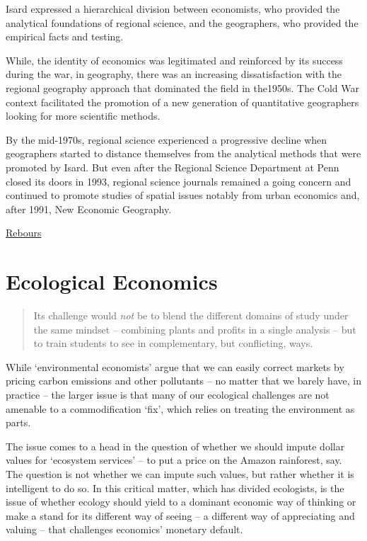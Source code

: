\documentclass[
]{book}
\begin{document}
Isard expressed a hierarchical division between economists, who provided
the analytical foundations of regional science,
and the geographers, who provided the empirical facts and testing.

While, the identity of economics was legitimated and reinforced by its success during the war, in geography, there was an increasing dissatisfaction with the regional geography approach that dominated the field in the1950s. The Cold War context facilitated the promotion of a new generation of quantitative geographers looking for more scientific methods.

By the mid-1970s, regional science experienced a progressive decline when geographers started to distance themselves from the analytical methods that were promoted by Isard. But even after the Regional Science Department at Penn closed its doors in 1993, regional science journals remained a going concern and continued to promote studies of spatial issues notably from urban economics and, after 1991, New Economic Geography.

\href{https://hscif.org/economists-in-the-city-rebours/}{Rebours}

\hypertarget{ecological-economics}{%
\chapter{Ecological Economics}\label{ecological-economics}}

\begin{quote}
Its challenge would \emph{not} be to blend the different domains of study under the same mindset -- combining plants and profits in a single analysis -- but to train students to see in complementary, but conflicting, ways.
\end{quote}

While `environmental economists' argue that we can easily correct markets by pricing carbon emissions and other pollutants -- no matter that we barely have, in practice -- the larger issue is that many of our ecological challenges are not amenable to a commodification `fix', which relies on treating the environment as parts.

The issue comes to a head in the question of whether we should impute dollar values for `ecosystem services' -- to put a price on the Amazon rainforest, say. The question is not whether we can impute such values, but rather whether it is intelligent to do so. In this critical matter, which has divided ecologists, is the issue of whether ecology should yield to a dominant economic way of thinking or make a stand for its different way of seeing -- a different way of appreciating and valuing -- that challenges economics' monetary default.
\end{document}
